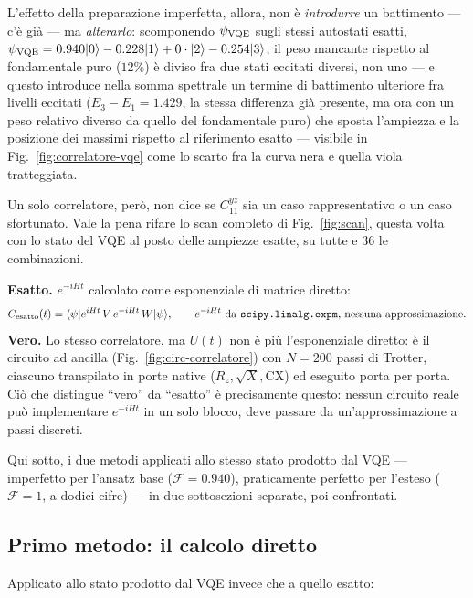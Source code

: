 \documentclass[11pt,a4paper]{article}
\begin{document}
L'effetto della preparazione imperfetta, allora, non è \emph{introdurre}
un battimento --- c'è già --- ma \emph{alterarlo}: scomponendo
$\psi_{\rm VQE}$ sugli stessi autostati esatti,
$\psi_{\rm VQE}=0.940\lvert 0\rangle-0.228\lvert 1\rangle+0\cdot\lvert 2\rangle-0.254\lvert 3\rangle$, il peso
mancante rispetto al fondamentale puro ($12\%$) è diviso fra due stati
eccitati diversi, non uno --- e questo introduce nella somma spettrale
un termine di battimento ulteriore fra livelli eccitati
($E_3-E_1=1.429$, la stessa differenza già presente, ma ora con un peso
relativo diverso da quello del fondamentale puro) che sposta l'ampiezza e la
posizione dei massimi rispetto al riferimento esatto --- visibile in
Fig.~\ref{fig:correlatore-vqe} come lo scarto fra la curva nera e quella
viola tratteggiata.

Un solo correlatore, però, non dice se $C_{11}^{yz}$ sia un caso rappresentativo
o un caso sfortunato. Vale la pena rifare lo scan completo di
Fig.~\ref{fig:scan}, questa volta con lo stato del VQE al posto delle
ampiezze esatte, su tutte e $36$ le combinazioni.

\medskip
\noindent\textbf{Esatto.} $e^{-iHt}$ calcolato come esponenziale di matrice
diretto:
\begin{equation*}
C_{\rm esatto}(t) = \langle \psi \rvert e^{iHt}\,V\,e^{-iHt}\,W\lvert \psi\rangle, \qquad
e^{-iHt} \text{ da \texttt{scipy.linalg.expm}, nessuna approssimazione.}
\end{equation*}
\noindent\textbf{Vero.} Lo stesso correlatore, ma $U(t)$ non è più
l'esponenziale diretto: è il circuito ad ancilla (Fig.~\ref{fig:circ-correlatore})
con $N=200$ passi di Trotter, ciascuno transpilato in porte native
($R_z,\sqrt X,\text{CX}$) ed eseguito porta per porta. Ciò che distingue
``vero'' da ``esatto'' è precisamente questo: nessun circuito reale può
implementare $e^{-iHt}$ in un solo blocco, deve passare da un'approssimazione
a passi discreti.

Qui sotto, i due metodi applicati allo stesso stato prodotto dal VQE ---
imperfetto per l'ansatz base ($\mathcal F=0.940$), praticamente perfetto
per l'esteso ($\mathcal F=1$, a dodici cifre) --- in
due sottosezioni separate, poi confrontati.

\subsection*{Primo metodo: il calcolo diretto}

Applicato allo stato prodotto dal VQE invece che a quello esatto:
\end{document}
